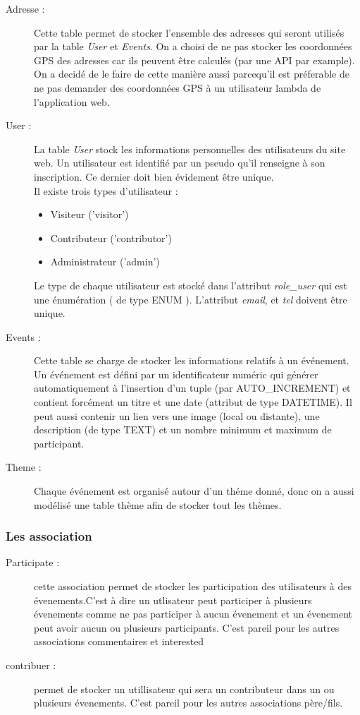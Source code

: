 \documentclass[oneside,11pt,a4paper]{article}
\begin{document}
\begin{description}
	\item[Adresse :] Cette table permet de stocker l'ensemble des adresses qui seront utilisés par la table \textit{User} et \textit{Events}. On a choisi de ne pas stocker les coordonnées GPS des adresses car ils peuvent être calculés (par une API par example). On a decidé de le faire de cette manière aussi parcequ'il est préferable de ne pas demander des coordonnées GPS à un utilisateur lambda de l'application web.
	\item[User :] La table \textit{User} stock les informations personnelles des utilisateurs du site web. Un utilisateur est identifié par un pseudo qu'il renseigne à son inscription. Ce dernier doit bien évidement être unique.\\ Il existe trois types d'utilisateur : 
	\begin{itemize}[label=\textbullet, font=\small \color{mygray}]
		\item Visiteur ('visitor')
		\item Contributeur ('contributor')
		\item Administrateur ('admin')
	\end{itemize}
	Le type de chaque utilisateur est stocké dans l'attribut \textit{role\_user} qui est une énumération ( de type ENUM ).
	L'attribut \textit{email}, et \textit{tel} doivent être unique.
	\item[Events :] Cette table se charge de stocker les informations relatifs à un événement. Un événement est défini par un identificateur numéric qui générer automatiquement à l'insertion d'un tuple (par AUTO\_INCREMENT) et contient forcément un titre et une date (attribut de type DATETIME). Il peut aussi contenir un lien vers une image (local ou distante), une description (de type TEXT) et un nombre minimum et maximum de participant.
	\item[Theme :] Chaque événement est organisé autour d'un théme donné, donc on a aussi modélisé une table thème afin de stocker tout les thèmes. 
\end{description}

\subsubsection*{Les association}

\begin{description}
	
	\item[Participate : ] cette association permet de stocker les participation des utilisateurs à des évenements.C'est à dire un utlisateur peut participer à plusieurs évenements comme ne pas participer à aucun évenement et un évenement peut avoir aucun ou plusieurs participants. C'est pareil pour les autres associations commentaires et interested
	
	\item[contribuer : ] permet de stocker un utillisateur qui sera un contributeur dans un ou plusieurs évenements. C'est pareil pour les autres associations père/fils. 
	
	
\end{description}
\end{document}
